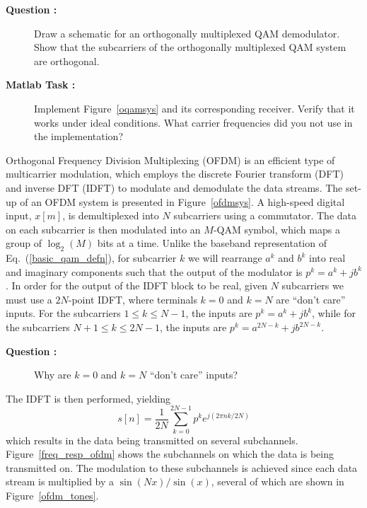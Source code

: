 \documentclass[12pt]{article}
\newcounter{questioncnt}
\newcounter{matlabcnt}
\begin{document}
\begin{description}
    \item[{\bf Question :}]
    Draw a schematic for an orthogonally multiplexed QAM
    demodulator. Show that the subcarriers of the orthogonally multiplexed
    QAM system are orthogonal.
\end{description}


\begin{description}
    \item[{\bf Matlab Task :}]
    Implement Figure~\ref{oqamsys} and its corresponding receiver.
    Verify that it works under ideal conditions. What carrier
    frequencies did you not use in the implementation?
\end{description}


Orthogonal Frequency Division Multiplexing (OFDM) is an efficient
type of multicarrier modulation, which employs the discrete
Fourier transform (DFT) and inverse DFT (IDFT) to modulate and
demodulate the data streams. The set-up of an OFDM system is
presented in Figure~\ref{ofdmsys}. A high-speed digital input,
$x[m]$, is demultiplexed into $N$ subcarriers using a commutator.
The data on each subcarrier is then modulated into an $M$-QAM
symbol, which maps a group of $\log_2(M)$ bits at a time. Unlike
the baseband representation of Eq.~(\ref{basic_qam_defn}), for
subcarrier $k$ we will rearrange $a^k$ and $b^k$ into real and
imaginary components such that the output of the modulator is
$p^k=a^k+jb^k$. In order for the output of the IDFT block to be
real, given $N$ subcarriers we must use a $2N$-point IDFT, where
terminals $k=0$ and $k=N$ are ``don't care'' inputs. For the
subcarriers $1\le{k}\le{N-1}$, the inputs are $p^k=a^k+jb^k$,
while for the subcarriers $N+1\le{k}\le{2N-1}$, the inputs are
$p^{k}=a^{2N-k}+jb^{2N-k}$.

\begin{description}
    \item[{\bf Question :}]
    Why are $k=0$ and $k=N$ ``don't care'' inputs?
\end{description}

The IDFT is then performed, yielding
\begin{equation}
s[n]=\frac{1}{2N}\sum\limits_{k=0}^{2N-1}p^ke^{j(2\pi{nk}/2N)}
\end{equation}
which results in the data being transmitted on several
subchannels. Figure~\ref{freq_resp_ofdm} shows the subchannels on
which the data is being transmitted on. The modulation to these
subchannels is achieved since each data stream is multiplied by a
$\sin(Nx)/\sin(x)$, several of which are shown in
Figure~\ref{ofdm_tones}.
\end{document}
